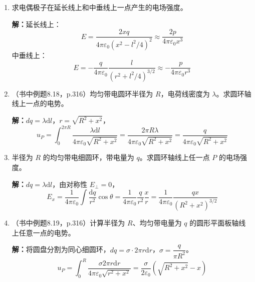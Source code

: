 \documentclass{ctexart}
\begin{document}
\begin{enumerate}
\textbf{解：}
(1) 由电势叠加原理：
\[
V_1 = \frac{q}{4\pi\varepsilon_0}\left(\frac{1}{R_1} - \frac{1}{R_2} + \frac{1}{R_3}\right) + \frac{Q}{4\pi\varepsilon_0 R_3},\quad
V_2 = \frac{Q+q}{4\pi\varepsilon_0 R_3}
\]

(2) $\Delta V = V_1 - V_2 = \dfrac{q}{4\pi\varepsilon_0}\left(\dfrac{1}{R_1} - \dfrac{1}{R_2}\right)$

(3) 导线连接后，电荷分布在球壳外表面：$V_1 = V_2 = \dfrac{Q+q}{4\pi\varepsilon_0 R_3}$，$\Delta V = 0$

(4) 外球接地：$V_2 = 0$，$V_1 = \dfrac{q}{4\pi\varepsilon_0}\left(\dfrac{1}{R_1} - \dfrac{1}{R_2}\right)$

(5) 内球接地：$V_1 = 0$，设内球带 $q'$，由 $V_1 = 0$ 解出 $q'$

\item 求电偶极子在延长线上和中垂线上一点产生的电场强度。

\textbf{解：}延长线上：
\[
E = \frac{2xq}{4\pi\varepsilon_0 (x^{2} - l^{2}/4)^{2}} \approx \frac{2p}{4\pi\varepsilon_0 x^{3}}
\]
中垂线上：
\[
E = -\frac{q}{4\pi\varepsilon_0}\frac{l}{(r^{2} + l^{2}/4)^{3/2}} \approx -\frac{p}{4\pi\varepsilon_0 r^{3}}
\]

\item（书中例题8.18，p.316）均匀带电圆环半径为 $R$，电荷线密度为 $\lambda$。求圆环轴线上一点的电势。

\textbf{解：}$dq = \lambda\mathrm{d}l$，$r = \sqrt{R^{2} + x^{2}}$，
\[
u_P = \int_0^{2\pi R} \frac{\lambda\mathrm{d}l}{4\pi\varepsilon_0\sqrt{R^{2}+x^{2}}}
= \frac{2\pi R\lambda}{4\pi\varepsilon_0\sqrt{R^{2}+x^{2}}} = \frac{q}{4\pi\varepsilon_0\sqrt{R^{2}+x^{2}}}
\]

\item 半径为 $R$ 的均匀带电细圆环，带电量为 $q$。求圆环轴线上任一点 $P$ 的电场强度。

\textbf{解：}$dq = \lambda\mathrm{d}l$，由对称性 $E_\perp = 0$，
\[
E_x = \frac{1}{4\pi\varepsilon_0}\int\frac{\mathrm{d}q}{r^{2}}\cos\theta
= \frac{1}{4\pi\varepsilon_0}\frac{q}{r^{2}}\frac{x}{r}
= \frac{1}{4\pi\varepsilon_0}\frac{qx}{(R^{2}+x^{2})^{3/2}}
\]

\item（书中例题8.19，p.316）计算半径为 $R$、均匀带电量为 $q$ 的圆形平面板轴线上任意一点的电势。

\textbf{解：}将圆盘分割为同心细圆环，$dq = \sigma\cdot 2\pi r\mathrm{d}r$，$\sigma = \dfrac{q}{\pi R^{2}}$。
\[
u_P = \int_0^{R} \frac{\sigma 2\pi r\mathrm{d}r}{4\pi\varepsilon_0\sqrt{r^{2}+x^{2}}}
= \frac{\sigma}{2\varepsilon_0}\left(\sqrt{R^{2}+x^{2}} - x\right)
\]


\end{enumerate}
\end{document}
